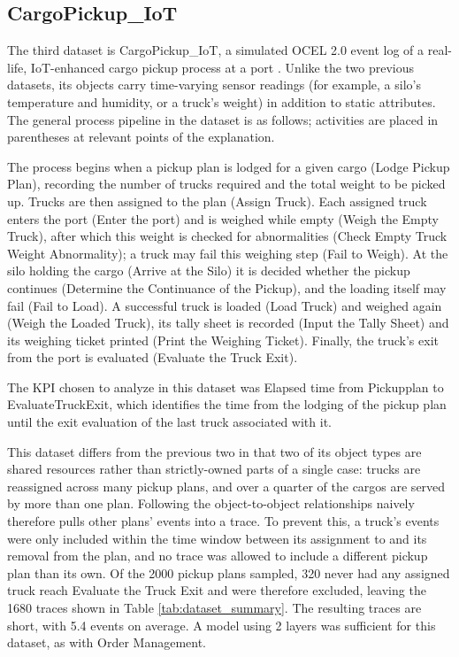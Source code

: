 	\subsection{CargoPickup\_IoT}
    \label{sec:dataset_cargo_pickup_iot}
		The third dataset is CargoPickup\_IoT, a simulated OCEL 2.0 event log of a real-life, IoT-enhanced cargo pickup process at a port \cite{wei2024}. Unlike the two previous datasets, its objects carry time-varying sensor readings (for example, a silo's temperature and humidity, or a truck's weight) in addition to static attributes. The general process pipeline in the dataset is as follows; activities are placed in parentheses at relevant points of the explanation.

		The process begins when a pickup plan is lodged for a given cargo (Lodge Pickup Plan), recording the number of trucks required and the total weight to be picked up. Trucks are then assigned to the plan (Assign Truck). Each assigned truck enters the port (Enter the port) and is weighed while empty (Weigh the Empty Truck), after which this weight is checked for abnormalities (Check Empty Truck Weight Abnormality); a truck may fail this weighing step (Fail to Weigh). At the silo holding the cargo (Arrive at the Silo) it is decided whether the pickup continues (Determine the Continuance of the Pickup), and the loading itself may fail (Fail to Load). A successful truck is loaded (Load Truck) and weighed again (Weigh the Loaded Truck), its tally sheet is recorded (Input the Tally Sheet) and its weighing ticket printed (Print the Weighing Ticket). Finally, the truck's exit from the port is evaluated (Evaluate the Truck Exit).

		The KPI chosen to analyze in this dataset was Elapsed time from Pickupplan to EvaluateTruckExit, which identifies the time from the lodging of the pickup plan until the exit evaluation of the last truck associated with it.

		This dataset differs from the previous two in that two of its object types are shared resources rather than strictly-owned parts of a single case: trucks are reassigned across many pickup plans, and over a quarter of the cargos are served by more than one plan. Following the object-to-object relationships naively therefore pulls other plans' events into a trace. To prevent this, a truck's events were only included within the time window between its assignment to and its removal from the plan, and no trace was allowed to include a different pickup plan than its own. Of the 2000 pickup plans sampled, 320 never had any assigned truck reach Evaluate the Truck Exit and were therefore excluded, leaving the 1680 traces shown in Table \ref{tab:dataset_summary}. The resulting traces are short, with 5.4 events on average. A model using 2 layers was sufficient for this dataset, as with Order Management.

